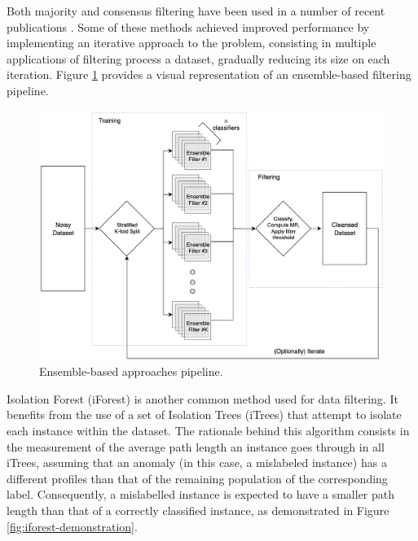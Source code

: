 \documentclass[12pt, english, openany]{book}
\begin{document}
Both majority and consensus filtering have been used in a number of recent
publications \cite{Garcia-Gil2019, Boukir2019, Pelletier2017Filtering, Zhang2018, Yuan2018}. Some of these methods
\cite{Boukir2019, Yuan2018} achieved improved performance by implementing an
iterative approach to the problem, consisting in multiple applications of
filtering process a dataset, gradually reducing its size on each iteration.
Figure \ref{fig:ensemble-filter-pipeline} provides a visual representation of an
ensemble-based filtering pipeline.

\begin{figure}[H]
  \centering
  \includegraphics[width=1\linewidth]{enfilter_pipeline.png}
  \caption{Ensemble-based approaches pipeline.}
  \label{fig:ensemble-filter-pipeline}
\end{figure}

Isolation Forest (iForest) \cite{Liu2008} is another common method
used for data filtering. It benefits from the use of a set of Isolation Trees
(iTrees) that attempt to isolate each instance within the dataset. The
rationale behind this algorithm consists in the measurement of the average path
length an instance goes through in all iTrees, assuming that an anomaly (in
this case, a mislabeled instance) has a different profiles than that of the
remaining population of the corresponding label. Consequently, a mislabelled
instance is expected to have a smaller path length than that of a correctly
classified instance, as demonstrated in Figure \ref{fig:iforest-demonstration}.
\end{document}

